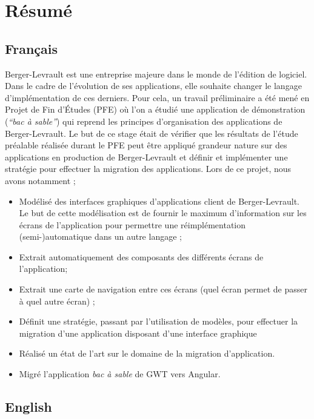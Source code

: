 \hypertarget{ruxe9sumuxe9}{%
\section{Résumé}\label{ruxe9sumuxe9}}

\hypertarget{franuxe7ais}{%
\subsection{Français}\label{franuxe7ais}}

Berger-Levrault est une entreprise majeure dans le monde de l'édition de
logiciel. Dans le cadre de l'évolution de ses applications, elle
souhaite changer le langage d'implémentation de ces derniers. Pour cela,
un travail préliminaire a été mené en Projet de Fin d'Études (PFE) où
l'on a étudié une application de démonstration (\emph{``bac à sable''})
qui reprend les principes d'organisation des applications de
Berger-Levrault. Le but de ce stage était de vérifier que les résultats
de l'étude préalable réalisée durant le PFE peut être appliqué grandeur
nature sur des applications en production de Berger-Levrault et définir
et implémenter une stratégie pour effectuer la migration des
applications. Lors de ce projet, nous avons notamment ;

\begin{itemize}
\tightlist
\item
  Modélisé des interfaces graphiques d'applications client de
  Berger-Levrault. Le but de cette modélisation est de fournir le
  maximum d'information sur les écrans de l'application pour permettre
  une réimplémentation (semi-)automatique dans un autre langage ;
\item
  Extrait automatiquement des composants des différents écrans de
  l'application;
\item
  Extrait une carte de navigation entre ces écrans (quel écran permet de
  passer à quel autre écran) ;
\item
  Définit une stratégie, passant par l'utilisation de modèles, pour
  effectuer la migration d'une application disposant d'une interface
  graphique
\item
  Réalisé un état de l'art sur le domaine de la migration d'application.
\item
  Migré l'application \emph{bac à sable} de GWT vers Angular.
\end{itemize}

\hypertarget{english}{%
\subsection{English}\label{english}}

